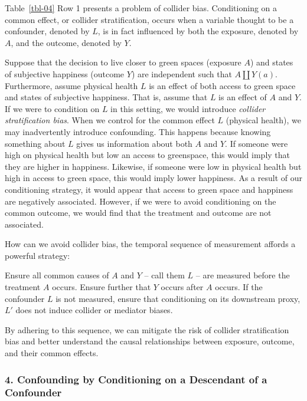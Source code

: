 \documentclass[
  singlecolumn]{article}
\begin{document}
Table~\ref{tbl-04} Row 1 presents a problem of collider bias.
Conditioning on a common effect, or collider stratification, occurs when
a variable thought to be a confounder, denoted by \(L\), is in fact
influenced by both the exposure, denoted by \(A\), and the outcome,
denoted by \(Y\).

Suppose that the decision to live closer to green spaces (exposure
\(A\)) and states of subjective happiness (outcome \(Y\)) are
independent such that \(A \coprod Y(a)\). Furthermore, assume physical
health \(L\) is an effect of both access to green space and states of
subjective happiness. That is, assume that \(L\) is an effect of \(A\)
and \(Y\). If we were to condition on \(L\) in this setting, we would
introduce \emph{collider stratification bias}. When we control for the
common effect \(L\) (physical health), we may inadvertently introduce
confounding. This happens because knowing something about \(L\) gives us
information about both \(A\) and \(Y\). If someone were high on physical
health but low an access to greenspace, this would imply that they are
higher in happiness. Likewise, if someone were low in physical health
but high in access to green space, this would imply lower happiness. As
a result of our conditioning strategy, it would appear that access to
green space and happiness are negatively associated. However, if we were
to avoid conditioning on the common outcome, we would find that the
treatment and outcome are not associated.

How can we avoid collider bias, the temporal sequence of measurement
affords a powerful strategy:

Ensure all common causes of \(A\) and \(Y\) -- call them \(L\) -- are
measured before the treatment \(A\) occurs. Ensure further that \(Y\)
occurs after \(A\) occurs. If the confounder \(L\) is not measured,
ensure that conditioning on its downstream proxy, \(L'\) does not induce
collider or mediator biases.

By adhering to this sequence, we can mitigate the risk of collider
stratification bias and better understand the causal relationships
between exposure, outcome, and their common effects.

\subsubsection{4. Confounding by Conditioning on a Descendant of a
Confounder}\label{confounding-by-conditioning-on-a-descendant-of-a-confounder}
\end{document}
